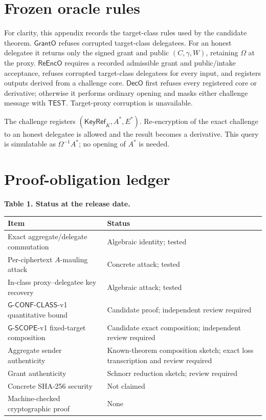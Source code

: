 \documentclass[11pt,letterpaper]{article}
\theoremstyle{definition}
\theoremstyle{remark}
\newcommand{\GClass}{\ensuremath{\mathsf{G\text{-}CONF\text{-}CLASS}}\xspace}
\newcommand{\GScope}{\ensuremath{\mathsf{G\text{-}SCOPE}}\xspace}
\newcommand{\KeyRef}{\ensuremath{\mathsf{KeyRef}}}
\newcommand{\ReEncO}{\ensuremath{\mathsf{ReEncO}}}
\newcommand{\DecO}{\ensuremath{\mathsf{DecO}}}
\newcommand{\GrantO}{\ensuremath{\mathsf{GrantO}}}
\newcommand{\TEST}{\ensuremath{\mathsf{TEST}}}
\begin{document}
\appendix
\section{Frozen oracle rules}

For clarity, this appendix records the target-class rules used by the candidate
theorem.  \(\GrantO\) refuses corrupted target-class delegatees.  For an honest
delegatee it returns only the signed grant and public \((C,\gamma,W)\), retaining
\(\Omega\) at the proxy.  \(\ReEncO\) requires a recorded admissible grant and
public/intake acceptance, refuses corrupted target-class delegatees for every
input, and registers outputs derived from a challenge core.  \(\DecO\) first
refuses every registered core or derivative; otherwise it performs ordinary
opening and masks either challenge message with \(\TEST\).  Target-proxy
corruption is unavailable.

The challenge registers \((\KeyRef_K,A^*,E^*)\).  Re-encryption of the exact
challenge to an honest delegatee is allowed and the result becomes a derivative.
This query is simulatable as \(\Omega^{-1}A^*\); no opening of \(A^*\) is needed.

\section{Proof-obligation ledger}

\begin{center}
\textbf{Table 1. Status at the release date.}\par\smallskip
\begin{tabular}{p{}p{}}
\toprule
Item & Status \\
\midrule
Exact aggregate/delegate commutation & Algebraic identity; tested \\
Per-ciphertext \(A\)-mauling attack & Concrete attack; tested \\
In-class proxy--delegatee key recovery & Algebraic attack; tested \\
\GClass-v1 quantitative bound & Candidate proof; independent review required \\
\GScope-v1 fixed-target composition & Candidate exact composition; independent review required \\
Aggregate sender authenticity & Known-theorem composition sketch; exact loss transcription and review required \\
Grant authenticity & Schnorr reduction sketch; review required \\
Concrete SHA-256 security & Not claimed \\
Machine-checked cryptographic proof & None \\
\bottomrule
\end{tabular}
\end{center}



\end{document}
